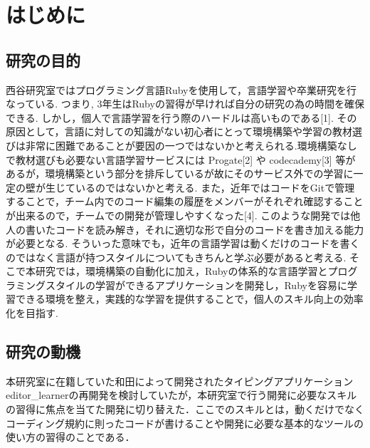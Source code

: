 \chapter{はじめに}\label{ux306fux3058ux3081ux306b}

    \section{研究の目的}\label{ux7814ux7a76ux306eux76eeux7684}

    西谷研究室ではプログラミング言語Rubyを使用して，言語学習や卒業研究を行なっている. つまり, 3年生はRubyの習得が早ければ自分の研究の為の時間を確保できる. しかし，個人で言語学習を行う際のハードルは高いものである[1]. その原因として，言語に対しての知識がない初心者にとって環境構築や学習の教材選びは非常に困難であることが要因の一つではないかと考えられる.環境構築なしで教材選びも必要ない言語学習サービスには Progate[2] や codecademy[3] 等があるが，環境構築という部分を排斥しているが故にそのサービス外での学習に一定の壁が生じているのではないかと考える.
また，近年ではコードをGitで管理することで，チーム内でのコード編集の履歴をメンバーがそれぞれ確認することが出来るので，チームでの開発が管理しやすくなった[4]. このような開発では他人の書いたコードを読み解き，それに適切な形で自分のコードを書き加える能力が必要となる. そういった意味でも，近年の言語学習は動くだけのコードを書くのではなく言語が持つスタイルについてもきちんと学ぶ必要があると考える.
そこで本研究では，環境構築の自動化に加え，Rubyの体系的な言語学習とプログラミングスタイルの学習ができるアプリケーションを開発し，Rubyを容易に学習できる環境を整え，実践的な学習を提供することで，個人のスキル向上の効率化を目指す.

    \section{研究の動機}\label{ux7814ux7a76ux306eux52d5ux6a5f}

    本研究室に在籍していた和田によって開発されたタイピングアプリケーションeditor\_learnerの再開発を検討していたが，本研究室で行う開発に必要なスキルの習得に焦点を当てた開発に切り替えた．ここでのスキルとは，動くだけでなくコーディング規約に則ったコードが書けることや開発に必要な基本的なツールの使い方の習得のことである．

    
